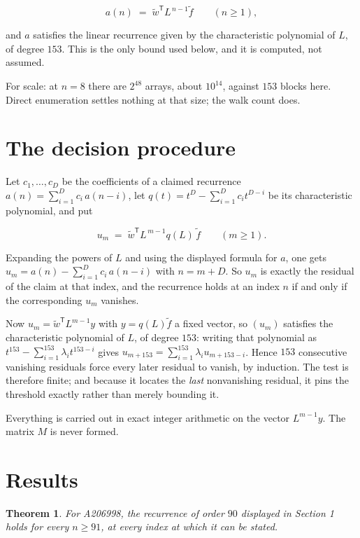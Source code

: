 \documentclass[11pt]{article}
\newtheorem{theorem}{Theorem}
\theoremstyle{definition}
\begin{document}
\[a(n) \;=\; \tilde w^{\mathsf T} L^{\,n-1} \tilde f \qquad (n \ge 1),\]

and $a$ satisfies the linear recurrence given by the characteristic polynomial of $L$, of degree $153$. This is the only bound used below, and it is computed, not assumed.

For scale: at $n = 8$ there are $2^{48}$ arrays, about $10^{14}$, against $153$ blocks here. Direct enumeration settles nothing at that size; the walk count does.

\section{The decision procedure}

Let $c_1,\dots,c_D$ be the coefficients of a claimed recurrence $a(n) = \sum_{i=1}^{D} c_i\,a(n-i)$, let $q(t) = t^{D} - \sum_{i=1}^{D} c_i t^{D-i}$ be its characteristic polynomial, and put

\[u_m \;=\; \tilde w^{\mathsf T} L^{\,m-1} q(L)\,\tilde f \qquad (m \ge 1).\]

Expanding the powers of $L$ and using the displayed formula for $a$, one gets $u_m = a(n) - \sum_{i=1}^{D} c_i\,a(n-i)$ with $n = m + D$. So $u_m$ is exactly the residual of the claim at that index, and the recurrence holds at an index $n$ if and only if the corresponding $u_m$ vanishes.

Now $u_m = \tilde w^{\mathsf T} L^{m-1} y$ with $y = q(L)\tilde f$ a fixed vector, so $(u_m)$ satisfies the characteristic polynomial of $L$, of degree $153$: writing that polynomial as $t^{153} - \sum_{i=1}^{153} \lambda_i t^{153-i}$ gives $u_{m+153} = \sum_{i=1}^{153} \lambda_i u_{m+153-i}$. Hence $153$ consecutive vanishing residuals force every later residual to vanish, by induction. The test is therefore finite; and because it locates the {\itshape last} nonvanishing residual, it pins the threshold exactly rather than merely bounding it.

Everything is carried out in exact integer arithmetic on the vector $L^{m-1}y$. The matrix $M$ is never formed.

\section{Results}

\begin{theorem} For A206998, the recurrence of order $90$ displayed in Section 1 holds for every $n \ge 91$, at every index at which it can be stated.\end{theorem}
\end{document}
